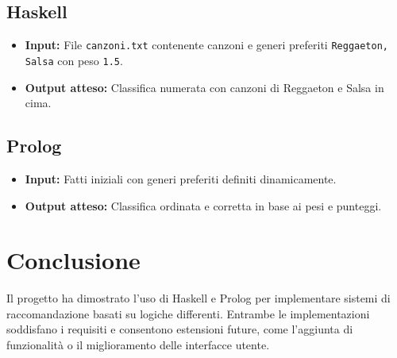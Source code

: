 \documentclass[a4paper,11pt]{article}
\begin{document}
\subsection{Haskell}
\begin{itemize}
    \item \textbf{Input:} File \texttt{canzoni.txt} contenente canzoni e generi preferiti \texttt{Reggaeton, Salsa} con peso \texttt{1.5}.
    \item \textbf{Output atteso:} Classifica numerata con canzoni di Reggaeton e Salsa in cima.
\end{itemize}

\subsection{Prolog}
\begin{itemize}
    \item \textbf{Input:} Fatti iniziali con generi preferiti definiti dinamicamente.
    \item \textbf{Output atteso:} Classifica ordinata e corretta in base ai pesi e punteggi.
\end{itemize}

\section{Conclusione}
Il progetto ha dimostrato l'uso di Haskell e Prolog per implementare sistemi di raccomandazione basati su logiche differenti. Entrambe le implementazioni soddisfano i requisiti e consentono estensioni future, come l'aggiunta di funzionalità o il miglioramento delle interfacce utente.
\end{document}
